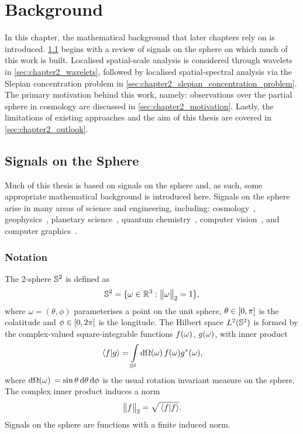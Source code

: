 \chapter{Background}\label{sec:chapter2}

In this chapter, the mathematical background that later chapters rely on is introduced.
\cref{sec:chapter2_signals_sphere} begins with a review of signals on the sphere on which much of this work is built.
Localised spatial-scale analysis is considered through wavelets in \cref{sec:chapter2_wavelets}, followed by localised spatial-spectral analysis via the Slepian concentration problem in \cref{sec:chapter2_slepian_concentration_problem}.
The primary motivation behind this work, namely: observations over the partial sphere in cosmology are discussed in \cref{sec:chapter2_motivation}.
Lastly, the limitations of existing approaches and the aim of this thesis are covered in \cref{sec:chapter2_outlook}.

\section{Signals on the Sphere}\label{sec:chapter2_signals_sphere}

Much of this thesis is based on signals on the sphere and, as such, some appropriate mathematical background is introduced here.
Signals on the sphere arise in many areas of science and engineering, including: cosmology~\cite{Bennett1996}, geophysics~\cite{Simons2006}, planetary science~\cite{Turcotte1981}, quantum chemistry~\cite{Choi1999}, computer vision~\cite{Cohen2018,Esteves2020,Cobb2021}, and computer graphics~\cite{Ramamoorthi2004}.

\subsection{Notation}\label{sec:chapter2_notation}

The 2-sphere \(\mathbb{S}^{2}{}\) is defined as
%
\begin{equation}
    \mathbb{S}^{2}{}
    = \{\omega \in \mathbb{R}^{3} : {\big\lVert\omega\big\rVert}_{2} = 1\},
\end{equation}
%
where \(\omega=(\theta,\phi)\) parameterises a point on the unit sphere, \(\theta \in \interval{0}{\pi}\) is the colatitude and \(\phi \in \interval[open right]{0}{2\pi}\) is the longitude.
The Hilbert space \(L^{2}(\mathbb{S}^{2})\) is formed by the complex-valued square-integrable functions \(f(\omega)\), \(g(\omega)\), with inner product
%
\begin{equation}
    \braket*{f}{g}
    = \displaystyle\int\limits_{\mathbb{S}^{2}} \dd{\Omega(\omega)} f(\omega) g^{\ast}(\omega),
\end{equation}
%
where \(\dd{\Omega(\omega)}{} = \sin{\theta} \dd{\theta} \dd{\phi}\) is the usual rotation invariant measure on the sphere.
The complex inner product induces a norm
%
\begin{equation}
    {\big\lVert f\big\rVert}_{2}
    = \sqrt{\braket*{f}}.
\end{equation}
%
Signals on the sphere are functions with a finite induced norm.

